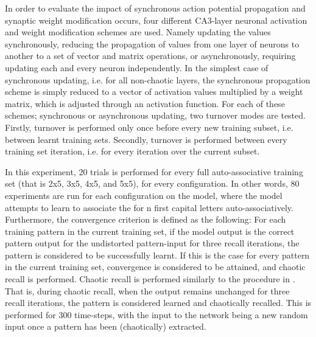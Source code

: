 In order to evaluate the impact of synchronous action potential propagation and synaptic weight modification occurs, four different CA3-layer neuronal activation and weight modification schemes are used. Namely updating the values synchronously, reducing the propagation of values from one layer of neurons to another to a set of vector and matrix operations, or asynchronously, requiring updating each and every neuron independently. In the simplest case of synchronous updating, i.e. for all non-chaotic layers, the synchronous propagation scheme is simply reduced to a vector of activation values multiplied by a weight matrix, which is adjusted through an activation function. For each of these schemes; synchronous or asynchronous updating, two turnover modes are tested. Firstly, turnover is performed only once before every new training subset, i.e. between learnt training sets. Secondly, turnover is performed between every training set iteration, i.e. for every iteration over the current subset.

In this experiment, 20 trials is performed for every full auto-associative training set (that is 2x5, 3x5, 4x5, and 5x5), for every configuration. In other words, 80 experiments are run for each configuration on the model, where the model attempts to learn to associate the for n first capital letters auto-associatively. Furthermore, the convergence criterion is defined as the following: For each training pattern in the current training set, if the model output is the correct pattern output for the undistorted pattern-input for three recall iterations, the pattern is considered to be successfully learnt. If this is the case for every pattern in the current training set, convergence is considered to be attained, and chaotic recall is performed. Chaotic recall is performed similarly to the procedure in \citep{Hattori2010, Hattori2014}. That is, during chaotic recall, when the output remains unchanged for three recall iterations, the pattern is considered learned and chaotically recalled. This is performed for 300 time-steps, with the input to the network being a new random input once a pattern has been (chaotically) extracted.


